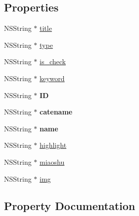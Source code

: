 \subsection*{Properties}
\begin{DoxyCompactItemize}
\item 
N\+S\+String $\ast$ \mbox{\hyperlink{interface_f_n_category_model_a9c6a837c7d7c04492dfc2bf3b1c4b0b5}{title}}
\item 
N\+S\+String $\ast$ \mbox{\hyperlink{interface_f_n_category_model_a78bcd8f1a2b6168a09b15bbdc8d7a164}{type}}
\item 
N\+S\+String $\ast$ \mbox{\hyperlink{interface_f_n_category_model_a75e17b0b36c95a82ba242ac086f202e2}{is\+\_\+check}}
\item 
N\+S\+String $\ast$ \mbox{\hyperlink{interface_f_n_category_model_aaa626da23f72d24a9c811626a0648650}{keyword}}
\item 
\mbox{\label{interface_f_n_category_model_a2c08eb76b5e56db2d45e9a53a4c51c6c}} 
N\+S\+String $\ast$ {\bfseries ID}
\item 
\mbox{\label{interface_f_n_category_model_ac52ec9064ea962fa1be646dbcf630be9}} 
N\+S\+String $\ast$ {\bfseries catename}
\item 
\mbox{\label{interface_f_n_category_model_a100afce6b7b8576bb3618938f0a010a3}} 
N\+S\+String $\ast$ {\bfseries name}
\item 
N\+S\+String $\ast$ \mbox{\hyperlink{interface_f_n_category_model_afb4bcf94ea287e497a46bee77893394f}{highlight}}
\item 
N\+S\+String $\ast$ \mbox{\hyperlink{interface_f_n_category_model_a635e390330827a721aac98e0dd3d015d}{miaoshu}}
\item 
N\+S\+String $\ast$ \mbox{\hyperlink{interface_f_n_category_model_a05efa98cdf60fc193bffcf097f8031c0}{img}}
\end{DoxyCompactItemize}


\subsection{Property Documentation}
\mbox{\label{interface_f_n_category_model_afb4bcf94ea287e497a46bee77893394f}} 
